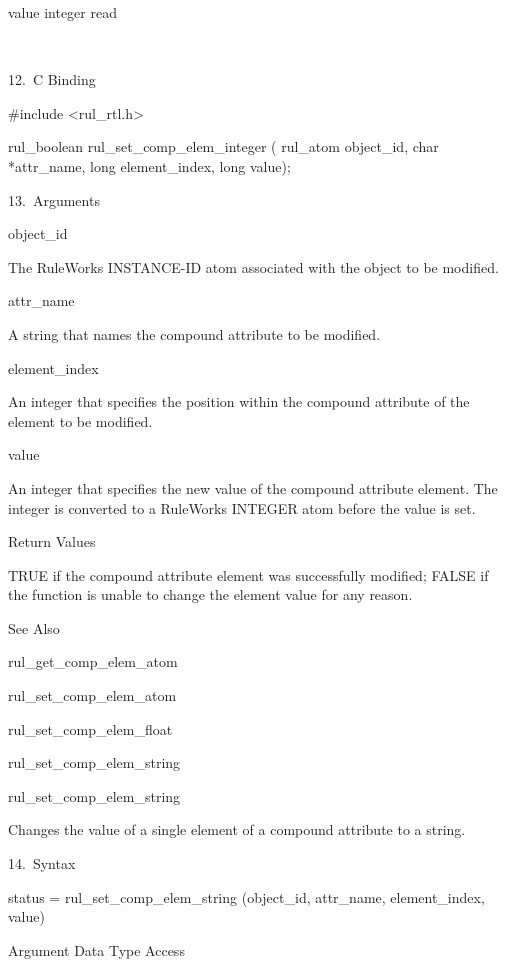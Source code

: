 {          value  integer     read

           

      12. C Binding

          #include <rul_rtl.h>

          rul_boolean
          rul_set_comp_elem_integer (
          rul_atom object_id,
          char *attr_name,
          long element_index,
          long value);

      13. Arguments

          object_id

          The RuleWorks INSTANCE-ID atom
          associated with the object to be
          modified.

          attr_name

          A string that names the compound
          attribute to be modified.

          element_index

          An integer that specifies the
          position within the compound
          attribute of the element to be
          modified.

          value

          An integer that specifies the new
          value of the compound attribute
          element. The integer is converted to
          a RuleWorks INTEGER atom before the
          value is set.

          Return Values

          TRUE if the compound attribute
          element was successfully modified;
          FALSE if the function is unable to
          change the element value for any
          reason.

          See Also

          rul_get_comp_elem_atom

          rul_set_comp_elem_atom

          rul_set_comp_elem_float

          rul_set_comp_elem_string

          rul_set_comp_elem_string

          Changes the value of a single
          element of a compound attribute to a
          string.

      14. Syntax

          status = rul_set_comp_elem_string
          (object_id, attr_name,
          element_index, value)

          Argument  Data Type     Access

}
